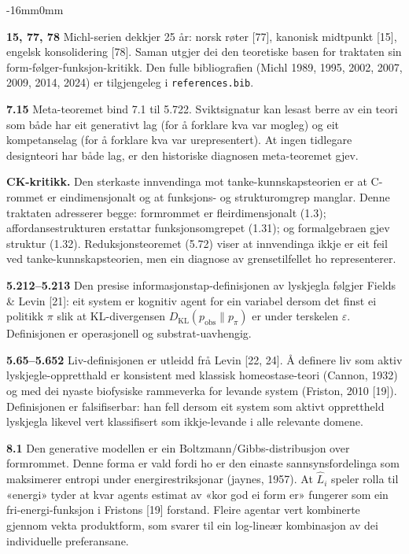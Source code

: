 \documentclass[10pt,oneside]{book}
\newenvironment{widebody}{%
  \begin{adjustwidth}{-16mm}{0mm}%
}{%
  \end{adjustwidth}%
}
\begin{document}
\begin{widebody}
{\textbf{15, 77, 78} Michl-serien dekkjer 25 år: norsk røter [77], kanonisk midtpunkt [15], engelsk konsolidering [78]. Saman utgjer dei den teoretiske basen for traktaten sin form-følger-funksjon-kritikk. Den fulle bibliografien (Michl 1989, 1995, 2002, 2007, 2009, 2014, 2024) er tilgjengeleg i \texttt{references.bib}.

\textbf{7.15} Meta-teoremet bind 7.1 til 5.722. Sviktsignatur kan lesast berre av ein teori som både har eit generativt lag (for å forklare kva var mogleg) og eit kompetanselag (for å forklare kva var urepresentert). At ingen tidlegare designteori har både lag, er den historiske diagnosen meta-teoremet gjev.

\textbf{CK-kritikk.} Den sterkaste innvendinga mot tanke-kunnskapsteorien er at C-rommet er eindimensjonalt og at funksjons- og strukturomgrep manglar. Denne traktaten adresserer begge: formrommet er fleirdimensjonalt (1.3); affordansestrukturen erstattar funksjonsomgrepet (1.31); og formalgebraen gjev struktur (1.32). Reduksjonsteoremet (5.72) viser at innvendinga ikkje er eit feil ved tanke-kunnskapsteorien, men ein diagnose av grensetilfellet ho representerer.

\bigskip
\textbf{5.212--5.213} Den presise informasjonstap-definisjonen av lyskjegla følgjer Fields \& Levin [21]: eit system er kognitiv agent for ein variabel dersom det finst ei politikk \(\pi\) slik at KL-divergensen \(D_{\mathrm{KL}}(p_{\mathrm{obs}} \| p_{\pi})\) er under terskelen \(\varepsilon\). Definisjonen er operasjonell og substrat-uavhengig.

\textbf{5.65--5.652} Liv-definisjonen er utleidd frå Levin [22, 24]. Å definere liv som aktiv lyskjegle-oppretthald er konsistent med klassisk homeostase-teori (Cannon, 1932) og med dei nyaste biofysiske rammeverka for levande system (Friston, 2010 [19]). Definisjonen er falsifiserbar: han fell dersom eit system som aktivt opprettheld lyskjegla likevel vert klassifisert som ikkje-levande i alle relevante domene.

\textbf{8.1} Den generative modellen er ein Boltzmann/Gibbs-distribusjon over formrommet. Denne forma er vald fordi ho er den einaste sannsynsfordelinga som maksimerer entropi under energirestriksjonar (jaynes, 1957). At \(\hat{L}_i\) speler rolla til «energi» tyder at kvar agents estimat av «kor god ei form er» fungerer som ein fri-energi-funksjon i Fristons [19] forstand. Fleire agentar vert kombinerte gjennom vekta produktform, som svarer til ein log-lineær kombinasjon av dei individuelle preferansane.

}
\end{widebody}
\end{document}
